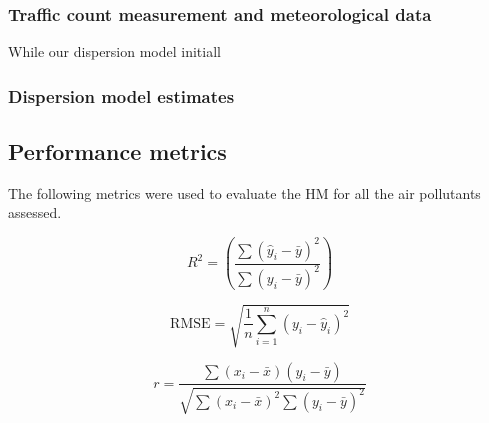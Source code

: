 \documentclass{article}
\begin{document}
\subsubsection{Traffic count measurement and meteorological data}
While our dispersion model initiall

\subsubsection{Dispersion model estimates}

\subsection{Performance metrics}
The following metrics were used to evaluate the HM for all the air pollutants assessed. 

\begin{equation}
R^2 = \left( \frac{\sum (\hat{y}_i - \bar{y})^2}{\sum (y_i - \bar{y})^2} \right)
\end{equation}

\begin{equation}
\text{RMSE} = \sqrt{\frac{1}{n} \sum_{i=1}^{n} (y_i - \hat{y}_i)^2}
\end{equation}

\begin{equation}
r = \frac{\sum (x_i - \bar{x})(y_i - \bar{y})}{\sqrt{\sum (x_i - \bar{x})^2 \sum (y_i - \bar{y})^2}}
\end{equation}
\vspace{0.5 cm}
\end{document}
